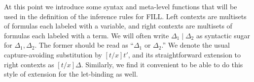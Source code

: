 \documentclass{elsarticle}
\newcommand{\FILLnt}[1]{\mathit{#1}}
\newcommand{\FILLmv}[1]{\mathit{#1}}
\newcommand{\FILLsym}[1]{#1}
\begin{document}
At this point we introduce some syntax and meta-level functions that
will be used in the definition of the inference rules for FILL. Left
contexts are multisets of formulas each labeled with a variable, and
right contexts are multisets of formulas each labeled with a term.  We
will often write $ \Delta_{{\mathrm{1}}}  \mid  \Delta_{{\mathrm{2}}} $ as syntactic sugar for $\Delta_{{\mathrm{1}}}  \FILLsym{,}  \Delta_{{\mathrm{2}}}$.
The former should be read as ``$\Delta_{{\mathrm{1}}}$ or $\Delta_{{\mathrm{2}}}$.''  We denote the
usual capture-avoiding substitution by $\FILLsym{[}  \FILLnt{t}  \FILLsym{/}  \FILLmv{x}  \FILLsym{]}  \FILLnt{t'}$, and its
straightforward extension to right contexts as $\FILLsym{[}  \FILLnt{t}  \FILLsym{/}  \FILLmv{x}  \FILLsym{]}  \Delta$.
Similarly, we find it convenient to be able to do this style of
extension for the let-binding as well.
\end{document}
